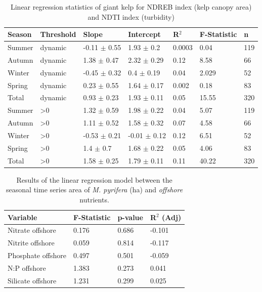 \documentclass[a4paper,fleqn]{cas-sc}
\begin{document}
\begin{table}[width=.9\linewidth,cols=6,pos=!htbp]
\caption{Linear regression statistics of giant kelp for NDREB index (kelp canopy area) and NDTI index (turbidity)}
\small
\begin{tabular*}{\tblwidth}{@{} LLLLLLL@{} }
\toprule
Season & Threshold &Slope & Intercept & R$^{2}$ & F-Statistic & n\\
\midrule
Summer  & dynamic & -0.11 $\pm$ 0.55 & 1.93 $\pm$ 0.2 & 0.0003 & 0.04 & 119 \\
Autumn  & dynamic & 1.38 $\pm$ 0.47 & 2.32 $\pm$ 0.29 & 0.12 & 8.58 & 66 \\
Winter  & dynamic & -0.45 $\pm$ 0.32 & 0.4 $\pm$ 0.19 & 0.04 & 2.029 & 52 \\
Spring  & dynamic & 0.23 $\pm$ 0.55 & 1.64 $\pm$ 0.17 & 0.002 & 0.18 & 83 \\
Total  & dynamic & 0.93 $\pm$ 0.23 & 1.93 $\pm$ 0.11 & 0.05 & 15.55 & 320 \\
Summer  & >0 & 1.32 $\pm$ 0.59 & 1.98 $\pm$ 0.22 & 0.04 & 5.07 & 119 \\
Autumn  & >0 & 1.11 $\pm$ 0.52 & 1.58 $\pm$ 0.32 & 0.07 & 4.58 & 66 \\
Winter  & >0 & -0.53 $\pm$ 0.21 & -0.01 $\pm$ 0.12 & 0.12 & 6.51 & 52 \\
Spring  & >0 & 1.4 $\pm$ 0.7 & 1.68 $\pm$ 0.22 & 0.05 & 4.06 & 83 \\
Total  & >0 & 1.58 $\pm$ 0.25 & 1.79 $\pm$ 0.11 & 0.11 & 40.22 & 320 \\\bottomrule
\end{tabular*}
\label{tab:15}
\end{table}

\begin{table}[width=.9\linewidth,cols=4,pos=!htbp]
\caption{Results of the linear regression model between the seasonal time series area of \textit{M. pyrifera} (ha) and \textit{offshore} nutrients.}\label{nutrientoff}
\small
\begin{tabular*}{\tblwidth}{@{} LLLL@{} }
\toprule
Variable & F-Statistic & p-value & R$^{2}$ (Adj) \\
\midrule
Nitrate offshore & 0.176 & 0.686 & -0.101 \\
Nitrite offshore & 0.059 & 0.814 & -0.117 \\
Phosphate offshore & 0.497 & 0.501 & -0.059 \\
N:P offshore & 1.383 & 0.273 & 0.041 \\
Silicate offshore & 1.231 & 0.299 & 0.025 \\
\bottomrule
\end{tabular*}
\label{tab:16}
\end{table}
\end{document}
